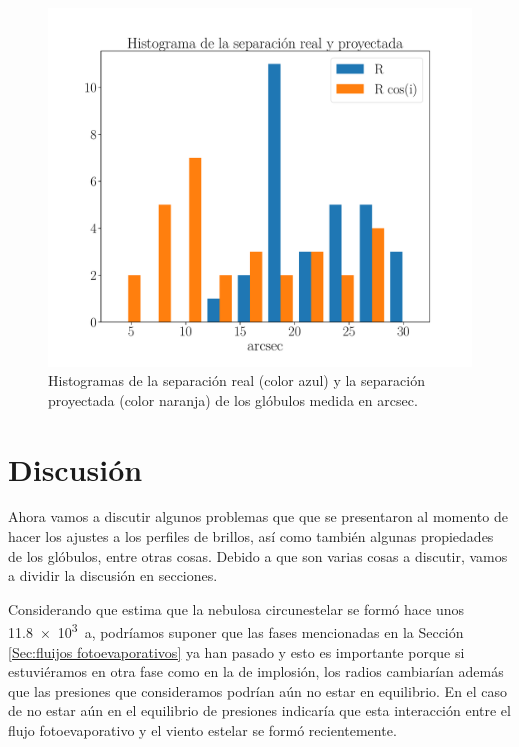\documentclass{book}
\begin{document}
\begin{figure}[htb]
    \centering
    \includegraphics[width=\textwidth]{ultimos/Hist_seprarcion(1).pdf}
    \caption{Histogramas de la separación real (color azul) y la
      separación proyectada (color naranja) de los glóbulos medida en
      arcsec.}
    \label{fig:hist_sep_ryp}
\end{figure}


\chapter{Discusión}\label{Chp:conclusiones}

Ahora vamos a discutir algunos problemas que que se presentaron al momento de hacer los ajustes a los perfiles de brillos, así como también algunas propiedades de los glóbulos, entre otras cosas. Debido a que son varias cosas a discutir, vamos a dividir la discusión en secciones.

Considerando que \cite{Zavala:2022} estima que la nebulosa circunestelar se formó hace unos \SI{11.8e3}{a}, podríamos suponer que las fases mencionadas en la Sección \ref{Sec:fluijos fotoevaporativos} ya han pasado y esto es importante porque si estuviéramos en otra fase como en la de implosión, los radios cambiarían además que las presiones que consideramos podrían aún no estar en equilibrio. En el caso de no estar aún en el equilibrio de presiones indicaría que esta interacción entre el flujo fotoevaporativo y el viento estelar se formó recientemente.\\
\end{document}
